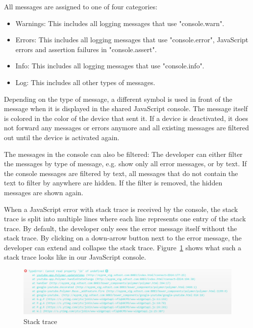 All messages are assigned to one of four categories:
\begin{itemize}
	\item Warnings: This includes all logging messages that use "console.warn".
	\item Errors: This includes all logging messages that use "console.error", JavaScript errors and assertion failures in "console.assert".
	\item Info: This includes all logging messages that use "console.info".
	\item Log: This includes all other types of messages.
\end{itemize}
Depending on the type of message, a different symbol is used in front of the message when it is displayed in the shared JavaScript console. The message itself is colored in the color of the device that sent it. If a device is deactivated, it does not forward any messages or errors anymore and all existing messages are filtered out until the device is activated again. 

The messages in the console can also be filtered: The developer can either filter the messages by type of message, e.g. show only all error messages, or by text. If the console messages are filtered by text, all messages that do not contain the text to filter by anywhere are hidden. If the filter is removed, the hidden messages are shown again.

When a JavaScript error with stack trace is received by the console, the stack trace is split into multiple lines where each line represents one entry of the stack trace. By default, the developer only sees the error message itself without the stack trace. By clicking on a down-arrow button next to the error message, the developer can extend and collapse the stack trace. Figure~\ref{fig:stack_trace} shows what such a stack trace looks like in our JavaScript console.

\begin{figure}[H]
  \centering
    \includegraphics[width=1.0\textwidth]{images/screenshots/stack_trace.png}
	\caption[Screenshot: Stack trace]{Stack trace}
	\label{fig:stack_trace}
\end{figure}

